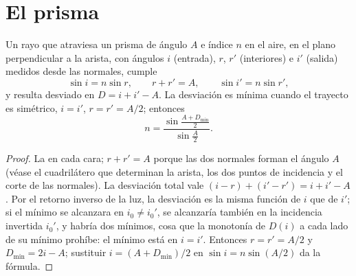 \section{El prisma}

\begin{proposition}\label{prop:b1:rays-reflection-refraction:prism}
Un rayo que atraviesa un prisma de ángulo $A$ e índice $n$ en el aire, en
el plano perpendicular a la arista, con ángulos $i$ (entrada), $r$, $r'$
(interiores) e $i'$ (salida) medidos desde las normales, cumple
\[
\sin i = n \sin r, \qquad r + r' = A, \qquad \sin i' = n \sin r',
\]
y resulta desviado en $D = i + i' - A$. La desviación es mínima cuando el
trayecto es simétrico, $i = i'$, $r = r' = A/2$; entonces
\[
n = \frac{\sin\frac{A + D_{\min}}{2}}{\sin\frac{A}{2}} .
\]
\end{proposition}

\begin{proof}
La  en cada cara; $r + r' = A$ porque las dos normales forman
el ángulo $A$ (véase el cuadrilátero que determinan la arista, los dos
puntos de incidencia y el corte de las normales). La desviación total vale
$(i - r) + (i' - r') = i + i' - A$. Por el retorno inverso de la luz, la
desviación es la misma función de $i$ que de $i'$; si el mínimo se
alcanzara en $i_0 \neq i_0'$, se alcanzaría también en la incidencia
invertida $i_0'$, y habría dos mínimos, cosa que la monotonía de $D(i)$ a
cada lado de su mínimo prohíbe: el mínimo está en $i = i'$. Entonces
$r = r' = A/2$ y $D_{\min} = 2i - A$; sustituir $i = (A +
D_{\min})/2$ en $\sin i = n\sin(A/2)$ da la fórmula.
\end{proof}

